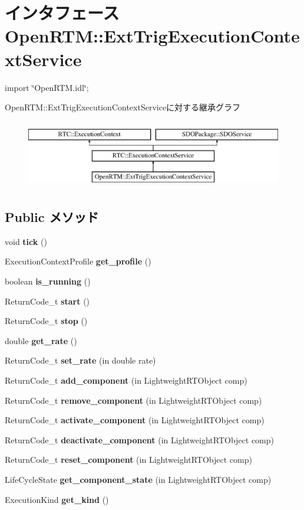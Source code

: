 \section{インタフェース OpenRTM::ExtTrigExecutionContextService}
\label{interfaceOpenRTM_1_1ExtTrigExecutionContextService}


{\ttfamily import \char`\"{}OpenRTM.idl\char`\"{};}

OpenRTM::ExtTrigExecutionContextServiceに対する継承グラフ\begin{figure}[H]
\begin{center}
\leavevmode
\includegraphics[height=3cm]{interfaceOpenRTM_1_1ExtTrigExecutionContextService}
\end{center}
\end{figure}
\subsection*{Public メソッド}
\begin{DoxyCompactItemize}
\item 
void {\bf tick} ()
\item 
ExecutionContextProfile {\bf get\_\-profile} ()
\item 
boolean {\bf is\_\-running} ()
\item 
ReturnCode\_\-t {\bf start} ()
\item 
ReturnCode\_\-t {\bf stop} ()
\item 
double {\bf get\_\-rate} ()
\item 
ReturnCode\_\-t {\bf set\_\-rate} (in double rate)
\item 
ReturnCode\_\-t {\bf add\_\-component} (in LightweightRTObject comp)
\item 
ReturnCode\_\-t {\bf remove\_\-component} (in LightweightRTObject comp)
\item 
ReturnCode\_\-t {\bf activate\_\-component} (in LightweightRTObject comp)
\item 
ReturnCode\_\-t {\bf deactivate\_\-component} (in LightweightRTObject comp)
\item 
ReturnCode\_\-t {\bf reset\_\-component} (in LightweightRTObject comp)
\item 
LifeCycleState {\bf get\_\-component\_\-state} (in LightweightRTObject comp)
\item 
ExecutionKind {\bf get\_\-kind} ()
\end{DoxyCompactItemize}


